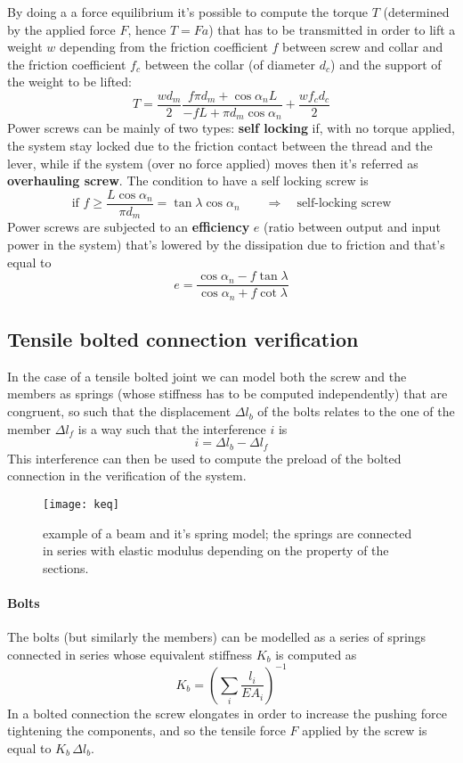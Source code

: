 	By doing a a force equilibrium it's possible to compute the torque $T$ (determined by the applied force $F$, hence $T = Fa$) that has to be transmitted in order to lift a weight $w$ depending from the friction coefficient $f$ between screw and collar and the friction coefficient $f_c$ between the collar (of diameter $d_c$) and the support of the weight to be lifted:
	\begin{equation}
		T = \frac{w d_m}{2} \frac{f\pi d_m + \cos\alpha_n L}{-fL + \pi d_m \cos\alpha_n} + \frac{wf_cd_c}{2}
	\end{equation}
	Power screws can be mainly of two types: \textbf{self locking} if, with no torque applied, the system stay locked due to the friction contact between the thread and the lever, while if the system (over no force applied) moves then it's referred as \textbf{overhauling screw}. The condition to have a self locking screw is
	\[ \textrm{if } f \geq \frac{L \cos \alpha_n}{\pi d_m} = \tan \lambda \cos \alpha_n \qquad \Rightarrow \quad \textrm{self-locking screw} \]
	Power screws are subjected to an \textbf{efficiency} $e$ (ratio between output and input power in the system) that's lowered by the dissipation due to friction and that's equal to
	\[ e = \frac{\cos \alpha_n - f \tan \lambda}{\cos \alpha_n + f \cot \lambda} \]
	
	
\subsection{Tensile bolted connection verification}
	In the case of a tensile bolted joint we can model both the screw and the members as springs (whose stiffness has to be computed independently) that are congruent, so such that the displacement $\Delta l_b$ of the bolts relates to the one of the member $\Delta l_f$ is a way such that the interference $i$ is
	\[ i = \Delta l_b - \Delta l_f \]		
	This interference can then be used to compute the preload of the bolted connection in the verification of the system.
	
	\begin{SCfigure}[2][bht]
		\centering \texttt{[image: keq]}
		\caption{example of a beam and it's spring model; the springs are connected in series with elastic modulus depending on the property of the sections.} \label{fig:keq}
	\end{SCfigure}

	\paragraph{Bolts} The bolts (but similarly the members) can be modelled as a series of springs connected in series whose equivalent stiffness $K_b$ is computed as
	\begin{equation} \label{eq:springseries}
		K_b = \left( \sum_i \frac{l_i}{E A_i} \right)^{-1}
	\end{equation}
	In a bolted connection the screw elongates in order to increase the pushing force tightening the components, and so the tensile force $F$ applied by the screw is equal to $K_b \, \Delta l_b$.
	
